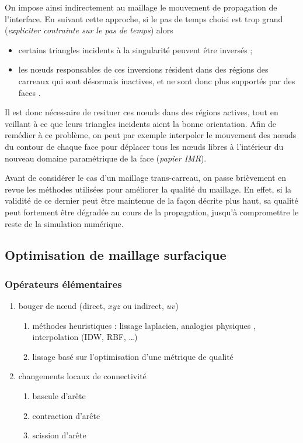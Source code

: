 On impose ainsi indirectement au maillage le mouvement de propagation de l'interface. 
%
En suivant cette approche, si le pas de temps choisi est trop grand (\textit{expliciter contrainte sur le pas de temps}) alors 
\begin{itemize}
	\item certains triangles incidents à la singularité peuvent être inversés ;
	\item les n\oe uds responsables de ces inversions résident dans des régions des carreaux qui sont désormais inactives, et ne sont donc plus supportés par des faces \brep.
\end{itemize}

Il est donc nécessaire de resituer ces n\oe uds dans des régions actives, tout en veillant à ce que leurs triangles incidents aient la bonne orientation. 
Afin de remédier à ce problème, on peut par exemple interpoler le mouvement des n\oe uds du contour de chaque face pour déplacer tous les n\oe uds libres à l'intérieur du nouveau domaine paramétrique de la face (\textit{\cf papier IMR}).
\par
Avant de considérer le cas d'un maillage trans-carreau, on passe brièvement en revue les méthodes utilisées pour améliorer la qualité du maillage. 
En effet, si la validité de ce dernier peut être maintenue de la façon décrite plus haut, sa qualité peut fortement être dégradée au cours de la propagation, jusqu'à compromettre le reste de la simulation numérique.


\subsection{Optimisation de maillage surfacique}


\subsubsection{Opérateurs élémentaires}
\begin{enumerate}
	\item bouger de n\oe ud (direct, \ie $xyz$ ou indirect, \ie $uv$)
	\begin{enumerate}
		\item méthodes heuristiques : lissage laplacien, analogies physiques \cite{farhat1998}, interpolation (IDW, RBF, \ldots)
		\item lissage basé sur l'optimisation d'une métrique de qualité \cite{freitag1995, canann1998, jiao2008, gargallo2014}
	\end{enumerate}
	\item changements locaux de connectivité
	\begin{enumerate}
		\item bascule d'arête
		\item contraction d'arête
		\item scission d'arête
	\end{enumerate}
\end{enumerate}

